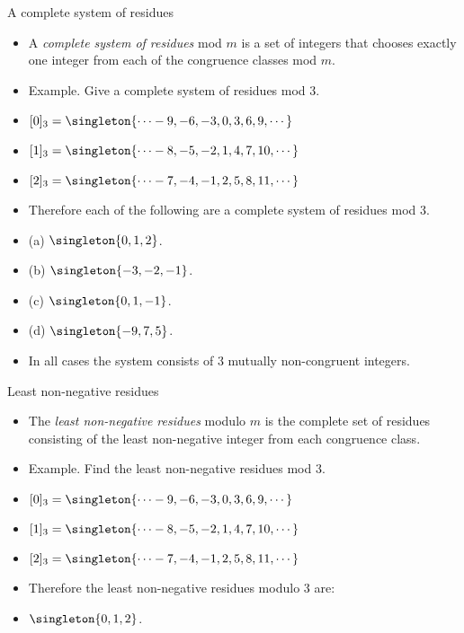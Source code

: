 \documentclass[handout]{beamer}
\begin{document}

\begin{frame}{A complete system of residues}

\begin{itemize}
  \item  A \emph{complete system of residues}  mod $m$ is a set of integers that
  chooses exactly one integer from each of the congruence classes mod $m$.
  \item Example. Give a complete system of residues mod $3$.
  \item $[0]_3 = \singleton{\cdots -9, -6, -3, 0, 3, 6, 9,\cdots}$
  \item $[1]_3 = \singleton{\cdots -8, -5, -2, 1, 4, 7, 10,\cdots}$
  \item $[2]_3 = \singleton{\cdots -7, -4, -1, 2, 5, 8, 11,\cdots}$
  \item Therefore each of the following are a complete system of residues mod 3.
  \item (a) $\singleton{0,1,2}$.
  \item (b) $\singleton{-3,-2,-1}$.
  \item (c) $\singleton{0,1,-1}$.
  \item (d) $\singleton{-9,7,5}$.
  \item In all cases the system consists of 3 mutually non-congruent integers.
\end{itemize}

\end{frame}

\begin{frame}{Least non-negative residues}

\begin{itemize}
  \item  The \emph{least non-negative residues} modulo $m$ is the complete set of residues
  consisting of the least non-negative integer from each congruence class.
  \item Example. Find the least non-negative residues mod $3$.
  \item $[0]_3 = \singleton{\cdots -9, -6, -3, 0, 3, 6, 9,\cdots}$
  \item $[1]_3 = \singleton{\cdots -8, -5, -2, 1, 4, 7, 10,\cdots}$
  \item $[2]_3 = \singleton{\cdots -7, -4, -1, 2, 5, 8, 11,\cdots}$
  \item Therefore the least non-negative residues modulo 3 are:
  \item $\singleton{0,1,2}$.
\end{itemize}

\end{frame}
\end{document}

